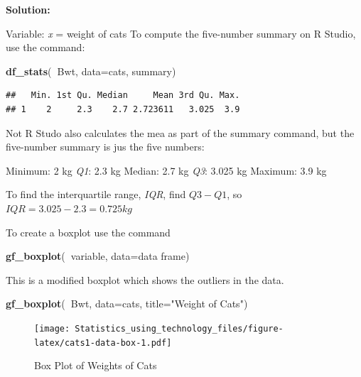 \documentclass[
]{book}
\newenvironment{Shaded}{\begin{snugshade}}{\end{snugshade}}
\newcommand{\DataTypeTok}[1]{\textcolor[rgb]{0.13,0.29,0.53}{#1}}
\newcommand{\KeywordTok}[1]{\textcolor[rgb]{0.13,0.29,0.53}{\textbf{#1}}}
\newcommand{\NormalTok}[1]{#1}
\newcommand{\OperatorTok}[1]{\textcolor[rgb]{0.81,0.36,0.00}{\textbf{#1}}}
\newcommand{\StringTok}[1]{\textcolor[rgb]{0.31,0.60,0.02}{#1}}
\begin{document}
\textbf{Solution:}

Variable: \emph{x} = weight of cats
To compute the five-number summary on R Studio, use the command:

\begin{Shaded}
\begin{Highlighting}[]
\KeywordTok{df_stats}\NormalTok{(}\OperatorTok{~}\NormalTok{Bwt, }\DataTypeTok{data=}\NormalTok{cats, summary)}
\end{Highlighting}
\end{Shaded}

\begin{verbatim}
##   Min. 1st Qu. Median     Mean 3rd Qu. Max.
## 1    2     2.3    2.7 2.723611   3.025  3.9
\end{verbatim}

Not R Studo also calculates the mea as part of the summary command, but the five-number summary is jus the five numbers:

Minimum: 2 kg
\emph{Q1}: 2.3 kg
Median: 2.7 kg
\emph{Q3}: 3.025 kg
Maximum: 3.9 kg

To find the interquartile range, \emph{IQR}, find \(Q3-Q1\), so \(IQR=3.025-2.3=0.725 kg\)

To create a boxplot use the command

\begin{Shaded}
\begin{Highlighting}[]
\KeywordTok{gf_boxplot}\NormalTok{(}\OperatorTok{~}\NormalTok{variable, }\DataTypeTok{data=}\NormalTok{data frame)}
\end{Highlighting}
\end{Shaded}

This is a modified boxplot which shows the outliers in the data.



\begin{Shaded}
\begin{Highlighting}[]
\KeywordTok{gf_boxplot}\NormalTok{(}\OperatorTok{~}\NormalTok{Bwt, }\DataTypeTok{data=}\NormalTok{cats, }\DataTypeTok{title=}\StringTok{"Weight of Cats"}\NormalTok{)}
\end{Highlighting}
\end{Shaded}

\begin{figure}
\centering
\texttt{[image: Statistics\_using\_technology\_files/figure-latex/cats1-data-box-1.pdf]}
\caption{\label{fig:cats1-data-box}Box Plot of Weights of Cats}
\end{figure}
\end{document}
